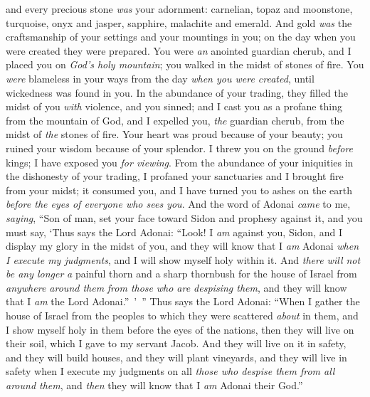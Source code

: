 \begin{biblechapter}
and every precious stone \textit{was} your adornment: 
carnelian, topaz and moonstone, 
turquoise, onyx and jasper, 
sapphire, malachite and emerald. 
And gold \textit{was} the craftsmanship of your settings 
and your mountings in you; 
on the day when you were created they were prepared.
\verse You were \textit{an} anointed guardian cherub, 
and I placed you on \textit{God’s holy mountain}; 
you walked in the midst of stones of fire.
\verse You \textit{were} blameless in your ways 
from the day \textit{when you were created}, 
until wickedness was found in you.
\verse In the abundance of your trading, 
they filled the midst of you \textit{with} violence, and you sinned; 
and I cast you as a profane thing from the mountain of God, 
and I expelled you, \textit{the} guardian cherub, 
from the midst of \textit{the} stones of fire.
\verse Your heart was proud because of your beauty; 
you ruined your wisdom because of your splendor. 
I threw you on the ground \textit{before} kings; 
I have exposed you \textit{for viewing}.
\verse From the abundance of your iniquities 
in the dishonesty of your trading, 
I profaned your sanctuaries 
and I brought fire from your midst; 
it consumed you, and I have turned you to ashes on the earth 
\textit{before the eyes of everyone who sees you}.
\verse And the word of Adonai \textit{came} to me, \textit{saying},
\verse “Son of man, set your face toward Sidon and prophesy against it,
\verse and you must say, ‘Thus says the Lord Adonai:
\verse “Look! I \textit{am} against you, Sidon, 
and I display my glory in the midst of you, 
and they will know that I \textit{am} Adonai 
\textit{when I execute my judgments}, 
and I will show myself holy within it.
\verse And \textit{there will not be any longer} \textit{a} painful thorn and a sharp thornbush for the house of Israel from \textit{anywhere around them} \textit{from those} \textit{who are despising them}, and they will know that I \textit{am} the Lord Adonai.” ’ ”
\verse Thus says the Lord Adonai: “When I gather the house of Israel from the peoples to which they were scattered \textit{about} in them, and I show myself holy in them before the eyes of the nations, then they will live on their soil, which I gave to my servant Jacob.
\verse And they will live on it in safety, and they will build houses, and they will plant vineyards, and they will live in safety when I execute my judgments on all \textit{those who despise them from all around them}, and \textit{then} they will know that I \textit{am} Adonai their God.”
\end{biblechapter}

